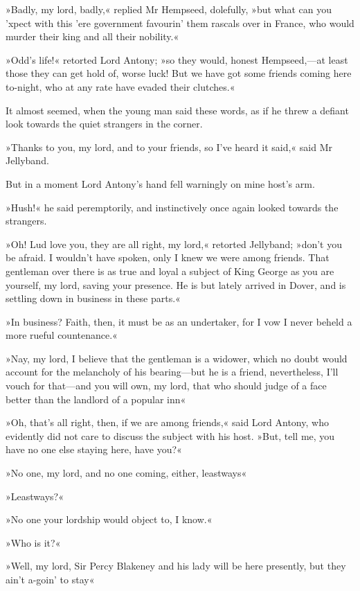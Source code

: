 »Badly, my lord, badly,« replied Mr Hempseed, dolefully, »but what can you 'xpect with this 'ere government favourin' them rascals over in France, who would murder their king and all their nobility.«

»Odd's life!« retorted Lord Antony; »so they would, honest Hempseed,\allowbreak---\allowbreak at least those they can get hold of, worse luck! But we have got some friends coming here to-night, who at any rate have evaded their clutches.«

It almost seemed, when the young man said these words, as if he threw a defiant look towards the quiet strangers in the corner.

»Thanks to you, my lord, and to your friends, so I've heard it said,« said Mr Jellyband.

But in a moment Lord Antony's hand fell warningly on mine host's arm.

»Hush!« he said peremptorily, and instinctively once again looked towards the strangers.

»Oh! Lud love you, they are all right, my lord,« retorted Jellyband; »don't you be afraid. I wouldn't have spoken, only I knew we were among friends. That gentleman over there is as true and loyal a subject of King George as you are yourself, my lord, saving your presence. He is but lately arrived in Dover, and is settling down in business in these parts.«

»In business? Faith, then, it must be as an undertaker, for I vow I never beheld a more rueful countenance.«

»Nay, my lord, I believe that the gentleman is a widower, which no doubt would account for the melancholy of his bearing\allowbreak---\allowbreak but he is a friend, nevertheless, I'll vouch for that\allowbreak---\allowbreak and you will own, my lord, that who should judge of a face better than the landlord of a popular inn\longdash«

»Oh, that's all right, then, if we are among friends,« said Lord Antony, who evidently did not care to discuss the subject with his host. »But, tell me, you have no one else staying here, have you?«

»No one, my lord, and no one coming, either,  leastways\longdash«

»Leastways?«

»No one your lordship would object to, I know.«

»Who is it?«

»Well, my lord, Sir Percy Blakeney and his lady will be here presently, but they ain't a-goin' to stay\longdash«

